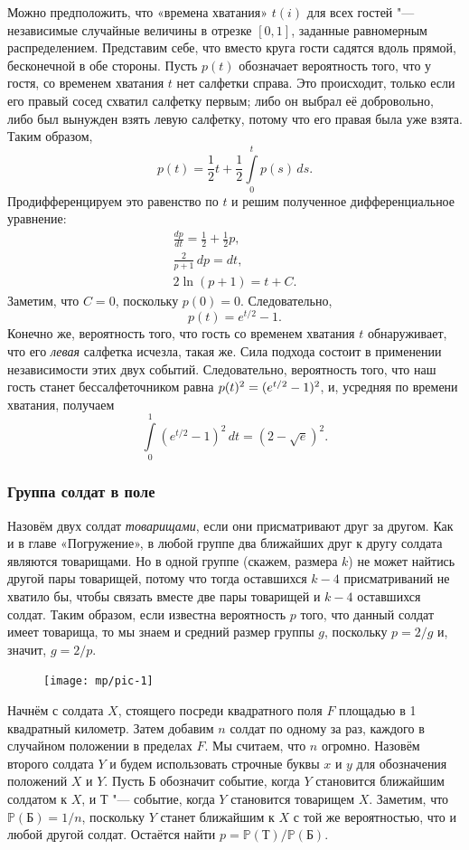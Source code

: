 \documentclass[twoside]{book}
\begin{document}
Можно предположить, что «времена хватания» $t(i)$ для всех гостей "--- независимые случайные величины в отрезке $[0,1]$, заданные равномерным распределением.
Представим себе, что вместо круга гости садятся вдоль прямой, бесконечной в обе стороны.
Пусть $p(t)$ обозначает вероятность того, что у гостя, со временем хватания $t$ нет салфетки справа.
Это происходит, только если его правый сосед схватил салфетку первым;
либо он выбрал её добровольно,
либо был вынужден взять левую салфетку, потому что его правая была уже взята.
Таким образом,
\[p(t)=\frac12t+\frac12\int\limits_0^tp(s)\,ds.\]
Продифференцируем это равенство по $t$ и решим полученное дифференциальное уравнение:
\begin{gather*}
\frac{dp}{dt}=\frac12+\frac12p,
\\
\frac2{p+1}\,dp=dt,
\\
2\ln(p+1)=t+C.
\end{gather*}
Заметим, что $C=0$, поскольку $p(0)=0$.
Следовательно,
\[p(t) = e^{t/2} - 1.\]
Конечно же, вероятность того, что гость со временем хватания $t$ обнаруживает, что его \emph{левая} салфетка исчезла, такая же.
Сила подхода состоит в применении независимости этих двух событий.
Следовательно, вероятность того, что наш гость станет бессалфеточником равна $p(t)^2 \z= (e^{t/2} -1)^2$, и, усредняя по времени хватания, получаем
\[\int\limits_0^1(e^{t/2}-1)^2\,dt=(2-\sqrt{e})^2.\]
\heartf

\subsubsection*{Группа солдат в поле}

Назовём двух солдат \emph{товарищами}, если они присматривают друг за другом.
Как и в главе «Погружение», в любой группе два ближайших друг к другу солдата являются товарищами.
Но в одной группе (скажем, размера $k$) не может найтись другой пары товарищей, потому что тогда оставшихся $k-4$ присматриваний не хватило бы, чтобы связать вместе две пары товарищей и $k-4$ оставшихся солдат.
Таким образом, если известна вероятность $p$ того, что данный солдат имеет товарища, то мы знаем и средний размер группы $g$, поскольку $p = 2/g$ и, значит, $g = 2/p$.

\begin{figure}[!ht]
\centering
\texttt{[image: mp/pic-1]} %
\end{figure}

Начнём с солдата $X$, стоящего посреди квадратного поля $F$ площадью в 1 квадратный километр.
Затем добавим $n$ солдат по одному за раз, каждого в случайном положении в пределах $F$. 
Мы считаем, что $n$ огромно.
Назовём второго солдата $Y$ и будем использовать строчные буквы $x$ и $y$ для обозначения положений $X$ и $Y$.
Пусть $\text{Б}$ обозначит событие, когда $Y$ становится ближайшим солдатом к $X$, 
и $\text{Т}$ "--- событие, когда $Y$ становится товарищем $X$.
Заметим, что $\mathbb{P}(\text{Б})=1/n$, поскольку $Y$ станет ближайшим к $X$ с той же вероятностью, что и любой другой солдат.
Остаётся найти $p=\mathbb{P}(\text{Т})/\mathbb{P}(\text{Б})$.
\end{document}
